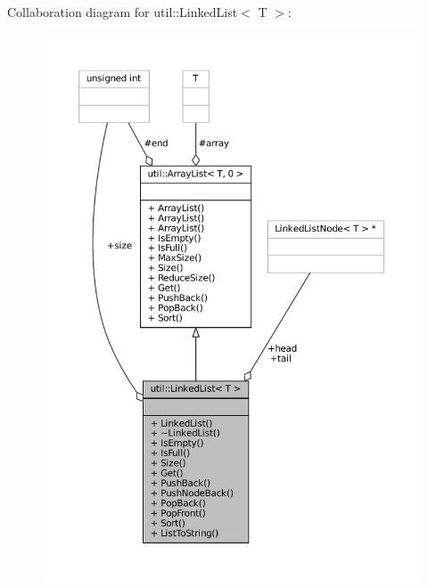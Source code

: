 Collaboration diagram for util\+:\+:Linked\+List$<$ T $>$\+:
\nopagebreak
\begin{figure}[H]
\begin{center}
\leavevmode
\includegraphics[width=350pt]{classutil_1_1LinkedList__coll__graph}
\end{center}
\end{figure}
